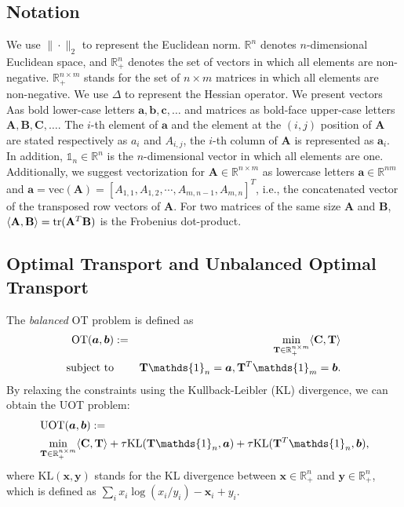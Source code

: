 \documentclass[conference]{IEEEtran}
\newcommand{\R}{\mathbb{R}}
\newcommand{\one}{\mathds{1}}
\newcommand{\mat}[1]{\mathbf{#1}}
\renewcommand{\vec}[1]{\bm{#1}}
\begin{document}
\subsection{Notation}
We use $\| \cdot \|_2$ to represent the Euclidean norm. $\mathbb{R}^n$ denotes $n$-dimensional Euclidean space, and $\mathbb{R}^n_+$ denotes the set of vectors in which all elements are non-negative. $\mathbb{R}^{n \times m}_+$ stands for the set of $n \times m$ matrices in which all elements are non-negative. We use $\Delta$ to represent the Hessian operator. We present vectors Aas bold lower-case letters $\vec{a},\vec{b},\vec{c},\dots$ and matrices as bold-face upper-case letters $\mat{A},\mat{B},\mat{C},\dots$. The $i$-th element of $\vec{a}$ and the element at the $(i,j)$ position of $\mat{A}$ are stated respectively as $a_i$ and ${A}_{i,j}$, the $i$-th column of $\mat{A}$ is represented as $\vec{a}_i$. In addition, $\one_n \in \mathbb{R}^n$ is the $n$-dimensional vector in which all elements are one. Additionally, we suggest vectorization for $\mat{A} \in \mathbb{R}^{n \times m}$ as lowercase letters $\vec{a} \in \mathbb{R}^{nm}$ and $\vec{a}=\text{vec}(\mat{A})=[{A}_{1,1}, {A}_{1,2}, \cdots, {A}_{m,n-1}, {A}_{m,n}]^T$, i.e., the concatenated vector of the transposed row vectors of $\mat{A}$.
For two matrices of the same size $\mat{A}$ and $\mat{B}$, $\langle \mat{A},\mat{B}\rangle={\rm tr}(\mat{A}^T\mat{B})$ is the Frobenius dot-product.

\subsection{Optimal Transport and Unbalanced Optimal Transport}
The {\it balanced} OT problem is defined as
\begin{eqnarray}
\label{Eq:Standard_OT}
\operatorname{OT}(\vec{a},\vec{b}) &:=& \min_{ \mat{T} \in \R_{+}^{n \times m}} \langle \mat{C}, \mat{T} \rangle \\
\text{subject\ to}&& \mat{T} \one_n= \vec{a}, \mat{T}^{T}\one_m = \vec{b}. \notag
\end{eqnarray}
By relaxing the constraints using the Kullback-Leibler (KL) divergence, we can obtain the UOT problem:
\begin{align}
\label{eq:uot}
&\operatorname{UOT}(\vec{a},\vec{b}) := \notag\\
&\min_{\mat{T} \in \R_{+}^{n \times m}} \langle \mat{C}, \mat{T} \rangle+ \tau \mathrm{KL}(\mat{T} \one_n,\vec{a}) + \tau \mathrm{KL}(\mat{T}^{T} \one_n,\vec{b}),
\end{align}
where $\mathrm{KL}(\vec{x},\vec{y})$ stands for the KL divergence between $\vec{x} \in \mathbb{R}_+^n$ and $\vec{y} \in \mathbb{R}_+^n$, which is defined as $\sum_i {x}_i \log {({x}_i/{y}_i)} - \vec{x}_i + {y}_i$.
\end{document}
